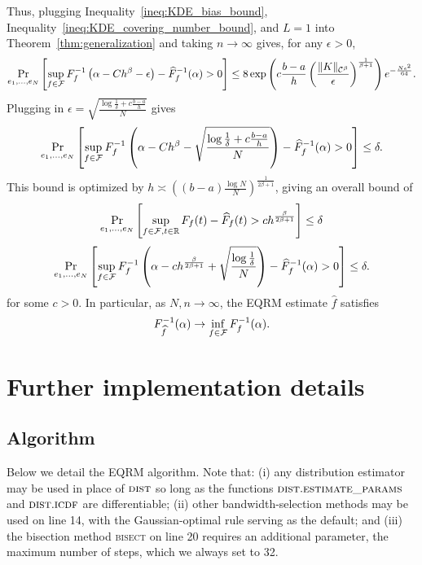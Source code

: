 \documentclass{article}
\begin{document}
Thus, plugging Inequality~\eqref{ineq:KDE_bias_bound}, Inequality~\eqref{ineq:KDE_covering_number_bound}, and $L = 1$ into Theorem~\ref{thm:generalization} and taking $n \to \infty$ gives, for any $\epsilon > 0$,
%
%
%
\[\Pr_{e_1,...,e_N} \left[ \sup_{f \in \mathcal{F}} F^{-1}_f\left(\alpha - C h^\beta - \epsilon \right) - \widehat F^{-1}_f(\alpha) > 0
        \right]
        \leq 8 \exp \left( c \frac{b - a}{h} \left( \frac{\|K\|_{\mathcal{C}^\beta}}{\epsilon} \right)^{\frac{1}{\beta+1}} \right) e^{-\frac{N\epsilon^2}{64}}.\]
Plugging in $\epsilon = \sqrt{\frac{\log \frac{1}{\delta} + c\frac{b - a}{h}}{N}}$ gives
%
%
%
\[\Pr_{e_1,...,e_N} \left[ \sup_{f \in \mathcal{F}} F^{-1}_f\left(\alpha - C h^\beta - \sqrt{\frac{\log \frac{1}{\delta} + c\frac{b - a}{h}}{N}} \right) - \widehat F^{-1}_f(\alpha) > 0
        \right]
        \leq \delta.\]
This bound is optimized by $h \asymp \left( (b - a) \frac{\log N}{N} \right)^{\frac{1}{2\beta + 1}}$, giving an overall bound of
\[\Pr_{e_1,...,e_N} \left[ \sup_{f \in \mathcal{F}, t \in \mathbb{R}} F_f(t) - \widehat F_f(t) > c h^\frac{\beta}{2\beta + 1} \right] \leq \delta\]
\[\Pr_{e_1,...,e_N} \left[ \sup_{f \in \mathcal{F}} F^{-1}_f\left(\alpha - c h^\frac{\beta}{2\beta + 1} + \sqrt{\frac{\log \frac{1}{\delta}}{N}} \right) - \widehat F^{-1}_f(\alpha) > 0
        \right]
        \leq \delta.\]
for some $c > 0$.
In particular, as $N, n \to \infty$, the EQRM estimate $\widehat f$ satisfies
\[F^{-1}_{\widehat f}(\alpha) \to \inf_{f \in \mathcal{F}} F^{-1}_f(\alpha).\]
%
%
%

%

%

%

%

%

\newpage
\section{Further implementation details}%
\label{sec:impl_details}%

\subsection{Algorithm}%
\label{sec:impl_details:algs}%
Below we detail the EQRM algorithm. Note that: (i) any distribution estimator may be used in place of $\textsc{dist}$ so long as the functions $\textsc{dist}.\textsc{estimate\_params}$ and $\textsc{dist}.\textsc{icdf}$ are differentiable; (ii) other bandwidth-selection methods may be used on line 14, with the Gaussian-optimal rule serving as the default; and (iii) the bisection method \textsc{bisect} on line 20 requires an additional parameter, the maximum number of steps, which we always set to 32.
\end{document}
